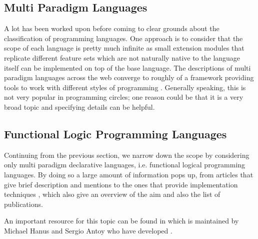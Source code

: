 \documentclass[thesis-solanki.tex]{subfiles}
\begin{document}
\subsection{Multi Paradigm Languages}

A lot has been worked upon before coming to clear grounds about the classification of programming languages.
One approach is to consider that the scope of each language is pretty much infinite as small extension modules that
replicate different feature sets which are not naturally native to the language itself can be implemented on top of
the base language.
The descriptions of multi paradigm languages across the web
\cite{website:wikimultiparadigm,website:mdn,website:blogc2} converge to roughly of a framework providing tools to work with different 
styles of programming \cite{website:wikimpllist,website:dmoz}.
Generally speaking, this
is not very popular in programming circles; one reason could be that it
is a very broad topic and specifying details can be helpful.

\subsection{Functional Logic Programming Languages}

Continuing from the previous section, we narrow down the scope by considering only multi paradigm declarative
languages, i.e. functional logical programming languages.
By doing so a large amount of information pops up, from articles that give brief description and mentions
\cite{website:wikiflpl, website:wikiflpllist} to the ones that provide implementation techniques
\cite{website:imlpementingflpl}, which also give an overview of the aim and also the list of publications.

\begin{comment}

The important piece however is the fact that there is a dedicated website \cite{website:funclogprog} for the history,
research and development, existing languages, the literature, the contacts and everything else that one can think
of for functional logic languages.
\end{comment}
An important resource for this topic can be found in \cite{website:funclogprog} which is maintained by Michael Hanus \cite{website:mhanus} 
and Sergio Antoy \cite{website:santoy} who have developed  \cite{hanus1995curry}.
\end{document}
